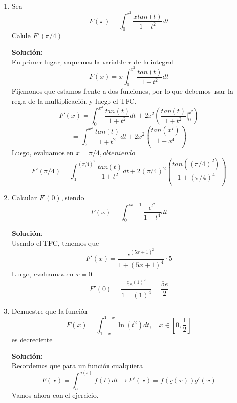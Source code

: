 \documentclass[12pt]{article}
\newenvironment{solucion}
{\begin{mdframed}[backgroundcolor=black!10]
		{\bf Solución:}\\
	}
	{
	\end{mdframed}
}
\newenvironment{preguntas}
{\begin{enumerate}\itemsep12pt
	}
	{
	\end{enumerate}
}
\newcommand{\ev}{\Big|}
\newcommand{\ra}{\rightarrow}
\begin{document}
\begin{preguntas}
\begin{solucion}
\begin{enumerate}[a)]
\item $\displaystyle\int (3x^2 + 2x + 1)dx = \displaystyle\int 3x^2dx + \displaystyle\int 2xdx + \displaystyle\int dx  = 3\displaystyle\int x^2dx + 2\displaystyle\int xdx + \displaystyle\int dx $
			$$= 3\dfrac{x^3}{3} + 2\dfrac{x^2}{2} + x + c = x^3 + x^2 + x + c$$
\item $\displaystyle\int x(x+1)(x+2)dx = \displaystyle\int (x^3+3x^2+2x)dx = \dfrac{x^4}{4}+x^3+x+c$
\item $\displaystyle\int sen^2(x)dx = \displaystyle\int \dfrac{1-cos(2x)}{2}dx = \displaystyle\int \dfrac{1}{2}dx - \displaystyle\int \dfrac{cos(2x)}{2} = \dfrac{x}{2} -\dfrac{sen(2x)}{4} + c$
\item $\displaystyle\int (1+e)^xdx = \dfrac{(1+e)^x}{ln(1+e)}$
\end{enumerate}
\end{solucion}
\item Sea
$$F(x) = \displaystyle\int_0^{x^2} \dfrac{xtan(t)}{1+t^2}dt$$
	Calule $F'(\pi /4)$
\begin{solucion}
En primer lugar, saquemos la variable $x$ de la integral
		$$F(x) = x\displaystyle\int_0^{x^2} \dfrac{tan(t)}{1+t^2}dt$$
		Fijemonos que estamos frente a dos funciones, por lo que debemos usar la regla de la multiplicación y luego el TFC.
		$$F'(x) = \displaystyle\int_0^{x^2} \dfrac{tan(t)}{1+t^2}dt + 2x^2\left(\dfrac{tan(t)}{1+t^2}\ev_0^{x^2}\right)$$
		$$= \displaystyle\int_0^{x^2} \dfrac{tan(t)}{1+t^2}dt + 2x^2\left(\dfrac{tan(x^2)}{1+x^4}\right)$$
		Luego, evaluamos en $x = \pi /4, obteniendo$
		$$F'(\pi /4) = \displaystyle\int_0^{(\pi /4)^2} \dfrac{tan(t)}{1+t^2}dt + 2(\pi /4)^2\left(\dfrac{tan((\pi /4)^2)}{1+(\pi /4)^4}\right)$$
\end{solucion}
\item Calcular $F'(0)$, siendo
	$$F(x) = \displaystyle\int_0^{5x+1} \dfrac{e^{t^2}}{1+t^4}dt$$
\begin{solucion}
Usando el TFC, tenemos que
		$$F'(x) = \dfrac{e^{(5x+1)^2}}{1+(5x+1)^4} \cdot 5$$
		Luego, evaluamos en $x=0$
		$$F'(0) = \dfrac{5e^{(1)^2}}{1+(1)^4} = \dfrac{5e}{2}$$
\end{solucion}
\item Demuestre que la función
$$F(x) = \displaystyle\int_{1-x}^{1+x} \ln(t^2)dt, \quad x \in [0, \frac{1}{2}]$$
es decreciente
\begin{solucion}
Recordemos que para un función cualquiera
$$F(x) = \displaystyle\int_a^{g(x)}f(t)dt \ra F'(x) = f(g(x))g'(x)$$
Vamos ahora con el ejercicio.\\


\end{solucion}
\end{preguntas}
\end{document}
